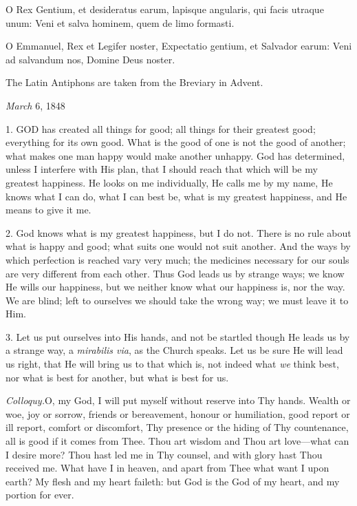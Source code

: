 O Rex Gentium, et desideratus
earum, lapisque angularis, qui facis utraque unum: Veni et salva hominem,
quem de limo formasti.


O Emmanuel, Rex et Legifer
noster, Expectatio gentium, et Salvador earum: Veni ad salvandum nos,
Domine Deus noster.

The Latin Antiphons are taken
from the Breviary in Advent.




\emph{March}
6, 1848

1. GOD
has created all things for good; all things for their greatest good;
everything for its own good. What is the good of one is not the good of
another; what makes one man happy would make another unhappy. God has
determined, unless I interfere with His plan, that I should reach that
which will be my greatest happiness. He looks on me individually, He
calls me by my name, He knows what I can do, what I can best be, what is
my greatest happiness, and He means to give it me.

2. God knows what is my greatest
happiness, but I do not. There is no rule about what is happy and good;
what suits one would not suit another. And the ways by which perfection
is reached vary very much; the medicines necessary for our souls are
very different from each other. Thus God leads us by strange ways;
we know He wills our happiness, but we neither know what our happiness
is, nor the way. We are blind; left to ourselves we should take the
wrong way; we must leave it to Him.

3. Let us put ourselves into His
hands, and not be startled though He leads us by a strange way, a \emph{mirabilis
via}, as the Church speaks. Let us be sure He will lead us right,
that He will bring us to that which is, not indeed what \emph{we} think
best, nor what is best for another, but what is best for us.

\emph{Colloquy.}O,
my God, I will put myself without reserve into Thy hands. Wealth or woe,
joy or sorrow, friends or bereavement, honour or humiliation, good
report or ill report, comfort or discomfort, Thy presence or the hiding
of Thy countenance, all is good if it comes from Thee. Thou art wisdom
and Thou art love—what can I desire more? Thou hast led me in Thy
counsel, and with glory hast Thou received me. What have I in heaven,
and apart from Thee what want I upon earth? My flesh and my heart
faileth: but God is the God of my heart, and my portion for ever.

